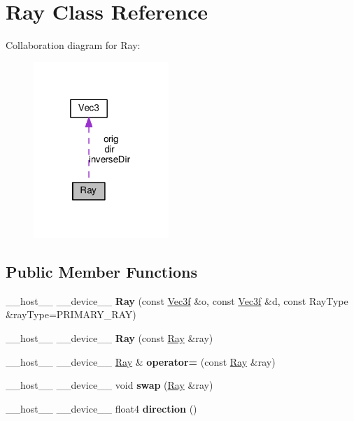 \hypertarget{class_ray}{}\section{Ray Class Reference}
\label{class_ray}


Collaboration diagram for Ray\+:
\nopagebreak
\begin{figure}[H]
\begin{center}
\leavevmode
\includegraphics[width=145pt]{class_ray__coll__graph}
\end{center}
\end{figure}
\subsection*{Public Member Functions}
\begin{DoxyCompactItemize}
\item 
\+\_\+\+\_\+host\+\_\+\+\_\+ \+\_\+\+\_\+device\+\_\+\+\_\+ {\bfseries Ray} (const \hyperlink{class_vec3}{Vec3f} \&o, const \hyperlink{class_vec3}{Vec3f} \&d, const Ray\+Type \&ray\+Type=P\+R\+I\+M\+A\+R\+Y\+\_\+\+R\+AY)\hypertarget{class_ray_a70dc24e77fd2f372f64481b84352ea79}{}\label{class_ray_a70dc24e77fd2f372f64481b84352ea79}

\item 
\+\_\+\+\_\+host\+\_\+\+\_\+ \+\_\+\+\_\+device\+\_\+\+\_\+ {\bfseries Ray} (const \hyperlink{class_ray}{Ray} \&ray)\hypertarget{class_ray_a6d8a9d6b5b86ab607f5713a88943095c}{}\label{class_ray_a6d8a9d6b5b86ab607f5713a88943095c}

\item 
\+\_\+\+\_\+host\+\_\+\+\_\+ \+\_\+\+\_\+device\+\_\+\+\_\+ \hyperlink{class_ray}{Ray} \& {\bfseries operator=} (const \hyperlink{class_ray}{Ray} \&ray)\hypertarget{class_ray_ae5f0c2eebb56ef7f3e4d43a49bfc94a7}{}\label{class_ray_ae5f0c2eebb56ef7f3e4d43a49bfc94a7}

\item 
\+\_\+\+\_\+host\+\_\+\+\_\+ \+\_\+\+\_\+device\+\_\+\+\_\+ void {\bfseries swap} (\hyperlink{class_ray}{Ray} \&ray)\hypertarget{class_ray_ac55e80131f5422dd969190ebb56a4be7}{}\label{class_ray_ac55e80131f5422dd969190ebb56a4be7}

\item 
\+\_\+\+\_\+host\+\_\+\+\_\+ \+\_\+\+\_\+device\+\_\+\+\_\+ float4 {\bfseries direction} ()\hypertarget{class_ray_afa09f7613e0f5e5e7e0d1093ea83df6b}{}\label{class_ray_afa09f7613e0f5e5e7e0d1093ea83df6b}

\end{DoxyCompactItemize}
